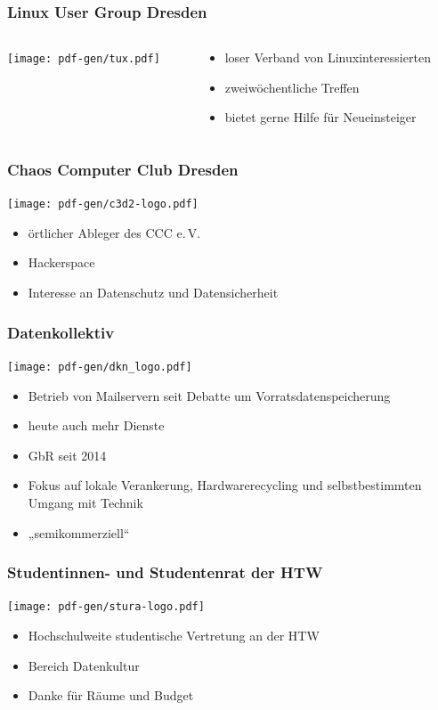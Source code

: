 \documentclass[t]{beamer}
\begin{document}
\begin{frame}
  \frametitle{Linux User Group Dresden}
  \begin{columns}
    \begin{column}[T]{0.45\textwidth}
      \texttt{[image: pdf-gen/tux.pdf]}
    \end{column}
    \begin{column}{0.45\textwidth}
      \begin{itemize}
      \item loser Verband von Linuxinteressierten
      \item zweiwöchentliche Treffen
      \item bietet gerne Hilfe für Neueinsteiger
      \end{itemize}
    \end{column}
  \end{columns}
\end{frame}

\begin{frame}
  \frametitle{Chaos Computer Club Dresden}
  \begin{center}
    \texttt{[image: pdf-gen/c3d2-logo.pdf]}
  \end{center}
  \begin{itemize}
  \item örtlicher Ableger des CCC e.\,V.
  \item Hackerspace
  \item Interesse an Datenschutz und Datensicherheit
  \end{itemize}
\end{frame}

\begin{frame}
  \frametitle{Datenkollektiv}
  \texttt{[image: pdf-gen/dkn\_logo.pdf]}
  \vspace*{-1em}
  \begin{itemize}
  \item Betrieb von Mailservern seit Debatte um Vorratsdatenspeicherung
  \item heute auch mehr Dienste
  \item GbR seit 2014
  \item Fokus auf lokale Verankerung, Hardwarerecycling und selbstbestimmten Umgang mit Technik
  \item „semikommerziell“
  \end{itemize}
\end{frame}

\begin{frame}
  \frametitle{Studentinnen- und Studentenrat der HTW}
  \begin{center}
    \texttt{[image: pdf-gen/stura-logo.pdf]}
  \end{center}
  \begin{itemize}
  \item Hochschulweite studentische Vertretung an der HTW
  \item Bereich Datenkultur
  \item Danke für Räume und Budget
  \end{itemize}
\end{frame}
\end{document}
